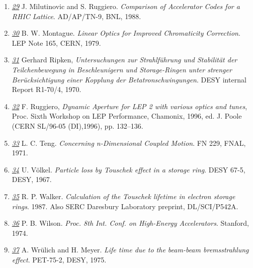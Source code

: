 \begin{enumerate}
   \item \href{ruggiero}{\textit{29}} J. Milutinovic and
     S. Ruggiero. \textit{Comparison of Accelerator Codes for a RHIC
       Lattice}. AD/AP/TN-9, BNL, 1988.  


   \item \href{montague}{\textit{30}} B. W. Montague. \textit{Linear
     Optics for Improved Chromaticity Correction}. LEP Note 165, CERN,
     1979.  


   \item \href{ripken}{\textit{31}} Gerhard Ripken,
     \textit{Untersuchungen zur Strahlf\"uhrung und Stabilit\"at der
       Teilchenbewegung in Beschleunigern und Storage-Ringen unter
       strenger Ber\"ucksichtigung einer Kopplung der
       Betatronschwingungen}. DESY internal Report R1-70/4, 1970.  


   \item \href{chamonix96}{\textit{32}} F. Ruggiero, \textit{Dynamic
     Aperture for LEP 2 with various optics and tunes}, Proc. Sixth
     Workshop on LEP Performance, Chamonix, 1996, ed. J. Poole (CERN
     SL/96-05 (DI),1996), pp. 132--136.  


   \item \href{teng}{\textit{33}} L. C. Teng. \textit{Concerning
     n-Dimensional Coupled Motion}. FN 229, FNAL, 1971.  


   \item \href{voelkel}{\textit{34}} U. V\"olkel. \textit{Particle loss
     by Touschek effect in a storage ring}. DESY 67-5, DESY, 1967.  


   \item \href{walker}{\textit{35}} R. P. Walker. \textit{Calculation of
     the Touschek lifetime in electron storage rings}. 1987. Also SERC
     Daresbury Laboratory preprint, DL/SCI/P542A.  


   \item \href{wilson}{\textit{36}} P. B. Wilson. \textit{Proc. 8th
     Int. Conf. on High-Energy Accelerators}. Stanford, 1974.  


   \item \href{wrulich}{\textit{37}} A. Wr\"ulich and
     H. Meyer. \textit{Life time due to the beam-beam bremsstrahlung
       effect}. PET-75-2, DESY, 1975. 

\end{enumerate}


